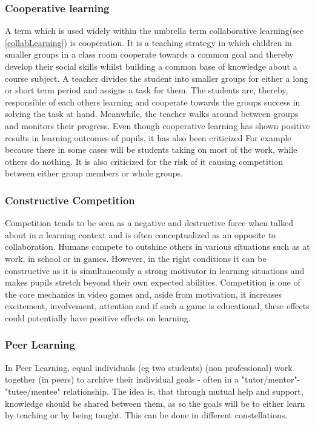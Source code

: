 \subsubsection{Cooperative learning}
A term which is used widely within the umbrella term collaborative learning(see \autoref{collabLearning}) is cooperation\cite{collaborationCooperation}. It is a teaching strategy in which children in smaller groups in a class room cooperate towards a common goal and thereby develop their social skills whilst building a common base of knowledge about a course subject\cite{collaborativeLearningTeachers}\cite[p.~15]{peerLearning}\cite{collaborationCompetition}\cite{cooperativeLearningPractice}. A teacher divides the student into smaller groups for either a long or short term period and assigns a task for them. The students are, thereby, responsible of each others learning and cooperate towards the groups success in solving the task at hand. Meanwhile, the teacher walks around between groups and monitors their progress\cite{cooperativeLearningPractice}. Even though cooperative learning has shown positive results in learning outcomes of pupils, it has also been criticized For example because there in some cases will be students taking on most of the work, while others do nothing. It is also criticized for the risk of it causing competition between either group members or whole groups\cite{collaborationCooperation}.

\subsubsection{Constructive Competition}
Competition tends to be seen as a negative and destructive force when talked about in a learning context and is often conceptualized as an opposite to collaboration\cite{collaborationCompetition}. Humans compete to outshine others in various situations such as at work, in school or in games\cite{collaborationCompetitionGames}\cite{collaborationCompetition}. However, in the right conditions it can be constructive as it is simultaneously a strong motivator in learning situations\cite{collaborationCompetitionGames} and makes pupils stretch beyond their own expected abilities\cite{collaborationCompetition}. Competition is one of the core mechanics in video games and, aside from  motivation, it increases excitement, involvement, attention and if such a game is educational, these effects could potentially have positive effects on learning\cite{collaborationCompetitionGames}. 

\subsubsection{Peer Learning} %
In Peer Learning, equal individuals (eg two students) (non professional) work together (in peers) to archive their individual goals \cite{peerLearning} - often in a "tutor/mentor"-"tutee/mentee" relationship. The idea is, that through mutual help and support, knowledge should be shared between them, as so the goals will be to either learn by teaching or by being taught. This can be done in different constellations\cite{collaborationCompetition}.

